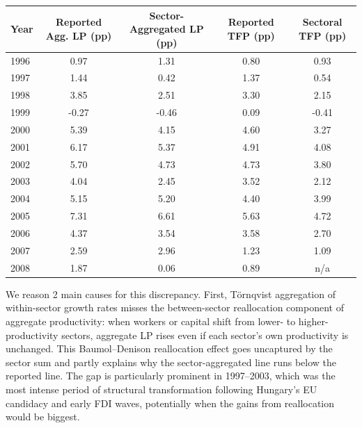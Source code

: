 \documentclass[11pt]{article}
\begin{document}
\begin{center}
\begin{tabular}{lcccc}
\toprule

Year & Reported Agg. LP (pp) & Sector-Aggregated LP (pp) & Reported TFP (pp) & Sectoral TFP (pp) \\

\midrule

1996 & 0.97 & 1.31 & 0.80 & 0.93 \\

1997 & 1.44 & 0.42 & 1.37 & 0.54 \\

1998 & 3.85 & 2.51 & 3.30 & 2.15 \\

1999 & -0.27 & -0.46 & 0.09 & -0.41 \\

2000 & 5.39 & 4.15 & 4.60 & 3.27 \\

2001 & 6.17 & 5.37 & 4.91 & 4.08 \\

2002 & 5.70 & 4.73 & 4.73 & 3.80 \\

2003 & 4.04 & 2.45 & 3.52 & 2.12 \\

2004 & 5.15 & 5.20 & 4.40 & 3.99 \\

2005 & 7.31 & 6.61 & 5.63 & 4.72 \\

2006 & 4.37 & 3.54 & 3.58 & 2.70 \\

2007 & 2.59 & 2.96 & 1.23 & 1.09 \\

2008 & 1.87 & 0.06 & 0.89 & n/a \\

\bottomrule
\end{tabular}
\end{center}

We reason 2 main causes for this discrepancy. First, Törnqvist aggregation of within-sector growth rates misses the between-sector reallocation component of aggregate productivity: when workers or capital shift from lower- to higher-productivity sectors, aggregate LP rises even if each sector’s own productivity is unchanged. This Baumol–Denison reallocation effect goes uncaptured by the sector sum and partly explains why the sector-aggregated line runs below the reported line. The gap is particularly prominent in 1997–2003, which was the most intense period of structural transformation following Hungary’s EU candidacy and early FDI waves, potentially when the gains from reallocation would be biggest.
\end{document}
